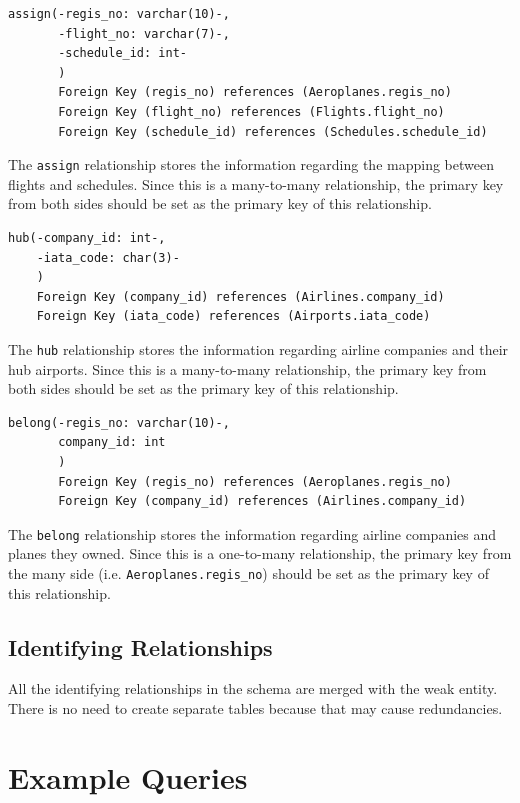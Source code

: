 \documentclass{article}
\begin{document}
	\begin{lstlisting}[keepspaces=true]		
assign(-regis_no: varchar(10)-,
       -flight_no: varchar(7)-,
       -schedule_id: int-
       )
       Foreign Key (regis_no) references (Aeroplanes.regis_no)
       Foreign Key (flight_no) references (Flights.flight_no)
       Foreign Key (schedule_id) references (Schedules.schedule_id)
	\end{lstlisting}    
	The \texttt{assign} relationship stores the information regarding the mapping between flights and schedules. Since this is a many-to-many relationship, the primary key from both sides should be set as the primary key of this relationship.

	\begin{lstlisting}[keepspaces=true]	
hub(-company_id: int-,
    -iata_code: char(3)-
    )
    Foreign Key (company_id) references (Airlines.company_id)
    Foreign Key (iata_code) references (Airports.iata_code)
	\end{lstlisting}    
	The \texttt{hub} relationship stores the information regarding airline companies and their hub airports. Since this is a many-to-many relationship, the primary key from both sides should be set as the primary key of this relationship.

	\begin{lstlisting}[keepspaces=true]	
belong(-regis_no: varchar(10)-,
       company_id: int
       )
       Foreign Key (regis_no) references (Aeroplanes.regis_no)
       Foreign Key (company_id) references (Airlines.company_id)
	\end{lstlisting}
    The \texttt{belong} relationship stores the information regarding airline companies and planes they owned. Since this is a one-to-many relationship, the primary key from the many side (i.e. \texttt{Aeroplanes.regis\_no}) should be set as the primary key of this relationship.
	
	\subsection{Identifying Relationships}
	
	All the identifying relationships in the schema are merged with the weak entity. There is no need to create separate tables because that may cause redundancies.
	
	\section{Example Queries}
	
\end{document}
